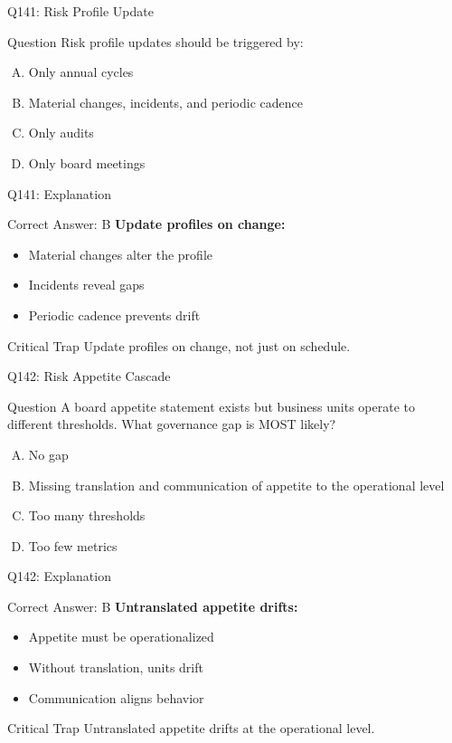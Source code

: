 \documentclass{beamer}
\begin{document}
	\begin{frame}{Q141: Risk Profile Update}
		\begin{block}{Question}
			Risk profile updates should be triggered by:
		\end{block}
		\begin{enumerate}[(A)]
			\item Only annual cycles
			\item Material changes, incidents, and periodic cadence
			\item Only audits
			\item Only board meetings
		\end{enumerate}
	\end{frame}
	
	\begin{frame}{Q141: Explanation}
		\begin{block}{Correct Answer: B}
			\textbf{Update profiles on change:}
			\begin{itemize}
				\item Material changes alter the profile
				\item Incidents reveal gaps
				\item Periodic cadence prevents drift
			\end{itemize}
		\end{block}
		\begin{alertblock}{Critical Trap}
			Update profiles on change, not just on schedule.
		\end{alertblock}
	\end{frame}
	
	\begin{frame}{Q142: Risk Appetite Cascade}
		\begin{block}{Question}
			A board appetite statement exists but business units operate to different thresholds. What governance gap is MOST likely?
		\end{block}
		\begin{enumerate}[(A)]
			\item No gap
			\item Missing translation and communication of appetite to the operational level
			\item Too many thresholds
			\item Too few metrics
		\end{enumerate}
	\end{frame}
	
	\begin{frame}{Q142: Explanation}
		\begin{block}{Correct Answer: B}
			\textbf{Untranslated appetite drifts:}
			\begin{itemize}
				\item Appetite must be operationalized
				\item Without translation, units drift
				\item Communication aligns behavior
			\end{itemize}
		\end{block}
		\begin{alertblock}{Critical Trap}
			Untranslated appetite drifts at the operational level.
		\end{alertblock}
	\end{frame}
	
\end{document}

